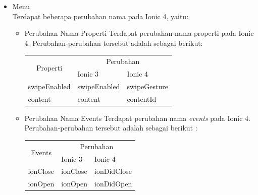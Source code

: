 \begin{enumerate}
\begin{enumerate}
\begin{itemize}
\begin{itemize}
				\item Menu \\
				Terdapat beberapa perubahan nama pada Ionic 4, yaitu:
				\begin{itemize}
					\item Perubahan Nama Properti
					Terdapat perubahan nama properti pada Ionic 4. Perubahan-perubahan tersebut adalah sebagai berikut:
\begin{table}[H]
\centering
\begin{tabular}{|l|ll|}
\hline
\multicolumn{1}{|c|}{\multirow{2}{*}{Properti}} & \multicolumn{2}{c|}{Perubahan}                   \\ \cline{2-3} 
\multicolumn{1}{|c|}{}                      & \multicolumn{1}{l|}{Ionic 3}      & Ionic 4      \\ \hline
swipeEnabled                                & \multicolumn{1}{l|}{swipeEnabled} & swipeGesture \\ \hline
content                                     & \multicolumn{1}{l|}{content}      & contentId    \\ \hline
\end{tabular}
\end{table}			

					\item Perubahan Nama Events
					Terdapat perubahan nama {\it events} pada Ionic 4. Perubahan-perubahan tersebut adalah sebagai berikut :
\begin{table}[H]
\centering
\begin{tabular}{|l|ll|}
\hline
\multicolumn{1}{|c|}{\multirow{2}{*}{Events}} & \multicolumn{2}{c|}{Perubahan}              \\ \cline{2-3} 
\multicolumn{1}{|c|}{}                        & \multicolumn{1}{l|}{Ionic 3}  & Ionic 4     \\ \hline
ionClose                                      & \multicolumn{1}{l|}{ionClose} & ionDidClose \\ \hline
ionOpen                                       & \multicolumn{1}{l|}{ionOpen}  & ionDidOpen  \\ \hline
\end{tabular}
\end{table}
				\end{itemize}


\end{itemize}
\end{itemize}
\end{enumerate}
\end{enumerate}

